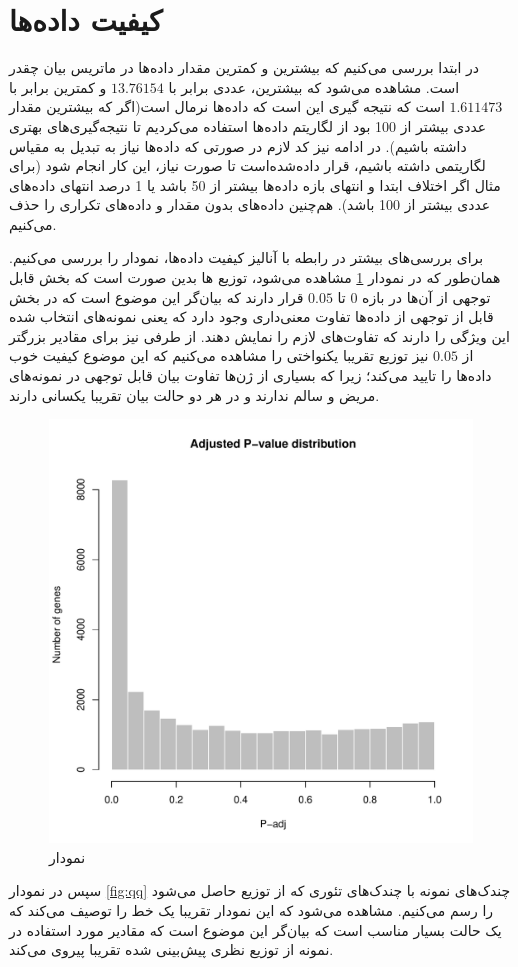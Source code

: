 \documentclass{article}
\begin{document}
\section{کیفیت داده‌ها}
در ابتدا بررسی می‌کنیم که بیشترین و کمترین مقدار داده‌ها در ماتریس بیان چقدر است. مشاهده می‌شود که بیشترین، عددی برابر با
$13.76154$
و کمترین برابر با
$1.611473$
است که نتیجه گیری این است که داده‌ها نرمال است(اگر که بیشترین مقدار عددی بیشتر از 100 بود از لگاریتم داده‌ها استفاده می‌کردیم تا نتیجه‌گیری‌های بهتری داشته باشیم). در ادامه نیز کد لازم در صورتی که داده‌ها نیاز به تبدیل به مقیاس لگاریتمی داشته باشیم، قرار داده‌شده‌است  تا صورت نیاز، این کار انجام شود (برای مثال اگر اختلاف ابتدا و انتهای بازه داده‌ها بیشتر از 50 باشد یا 1 درصد انتهای داده‌های عددی بیشتر از 100 باشد).
هم‌چنین داده‌های بدون مقدار و داده‌های تکراری را حذف می‌کنیم.


برای بررسی‌های بیشتر در رابطه با آنالیز کیفیت داده‌ها، نمودار
را بررسی می‌کنیم. همان‌طور که در نمودار \ref{fig:adj-pv-dist} مشاهده می‌شود،  توزیع 
ها بدین صورت است که بخش قابل توجهی از آن‌ها در بازه $0$ تا $0.05$ قرار دارند که بیان‌گر این موضوع است که در بخش قابل از توجهی از داده‌ها تفاوت معنی‌داری وجود دارد  که یعنی نمونه‌های انتخاب شده این ویژگی را دارند که تفاوت‌های لازم را نمایش دهند. از طرفی نیز برای مقادیر بزرگتر‌ از 
$ 0.05$ 
نیز توزیع تقریبا یکنواختی را مشاهده می‌کنیم که این موضوع کیفیت خوب داده‌ها را تایید می‌کند؛ زیرا که بسیاری از ژن‌ها تفاوت بیان قابل توجهی در نمونه‌های مریض و سالم ندارند و در هر دو حالت بیان تقریبا یکسانی دارند.

\begin{figure}[h!]
	\centering
	\includegraphics[width=0.5\columnwidth]{figs/adj-pv-dist.pdf}
	\caption{نمودار }
	\label{fig:adj-pv-dist}
\end{figure}

سپس در نمودار \ref{fig:qq} چندک‌های   نمونه با چندک‌های تئوری که از توزیع
حاصل می‌شود را رسم می‌کنیم. مشاهده می‌شود که این نمودار تقریبا یک خط را توصیف می‌کند که یک حالت بسیار مناسب است که بیان‌گر این موضوع است که مقادیر مورد استفاده در نمونه از توزیع نظری پیش‌بینی شده تقریبا پیروی می‌کند.
\end{document}
